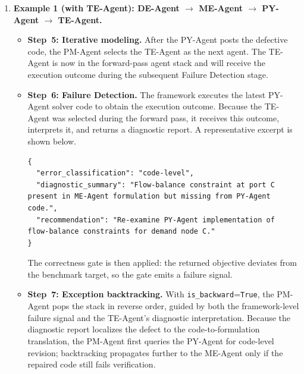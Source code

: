 \documentclass[11pt,a4paper]{article}
\begin{document}
\begin{enumerate}
\item \textbf{Example 1 (with TE-Agent): DE-Agent $\rightarrow$ ME-Agent $\rightarrow$ PY-Agent $\rightarrow$ TE-Agent.}
\begin{itemize}
\item \textbf{Step~5: Iterative modeling.} After the PY-Agent posts the defective code, the PM-Agent selects the TE-Agent as the next agent. The TE-Agent is now in the forward-pass agent stack and will receive the execution outcome during the subsequent Failure Detection stage.
\item \textbf{Step~6: Failure Detection.} The framework executes the latest PY-Agent solver code to obtain the execution outcome. Because the TE-Agent was selected during the forward pass, it receives this outcome, interprets it, and returns a diagnostic report. A representative excerpt is shown below.
\begin{promptbox}
\begin{lstlisting}[style=prompttemplate]
{
  "error_classification": "code-level",
  "diagnostic_summary": "Flow-balance constraint at port C present in ME-Agent formulation but missing from PY-Agent code.",
  "recommendation": "Re-examine PY-Agent implementation of flow-balance constraints for demand node C."
}
\end{lstlisting}
\end{promptbox}
The correctness gate is then applied: the returned objective deviates from the benchmark target, so the gate emits a failure signal.
\item \textbf{Step~7: Exception backtracking.} With \texttt{is\_backward}=\texttt{True}, the PM-Agent pops the stack in reverse order, guided by both the framework-level failure signal and the TE-Agent's diagnostic interpretation. Because the diagnostic report localizes the defect to the code-to-formulation translation, the PM-Agent first queries the PY-Agent for code-level revision; backtracking propagates further to the ME-Agent only if the repaired code still fails verification.
\end{itemize}


\end{enumerate}
\end{document}
